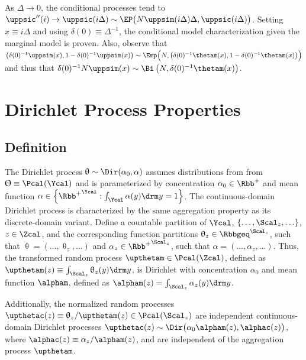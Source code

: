 \documentclass[12pt]{report}
\begin{document}
As $\Delta \to 0$, the conditional processes tend to $\uppsic''(i) \to \uppsic(i \Delta) \sim \EP\big( N \uppsim(i \Delta) \Delta, \uppsic(i \Delta) \big)$. Setting $x \equiv i\Delta$ and using $\delta(0) \equiv \Delta^{-1}$, the conditional model characterization given the marginal model is proven. Also, observe that $\big( \delta(0)^{-1} \uppsim(x),1 - \delta(0)^{-1} \uppsim(x)\big) \sim \Emp\Big( N, \big( \delta(0)^{-1} \thetam(x), 1 - \delta(0)^{-1} \thetam(x)\big) \Big)$ and thus that $\delta(0)^{-1} N \uppsim(x) \sim \Bi\left(N, \delta(0)^{-1} \thetam(x) \right)$.
 





\section{Dirichlet Process Properties} \label{app:DP}


\subsection{Definition}

The Dirichlet process $\uptheta \sim \Dir(\alpha_0,\alpha)$ assumes distributions from from $\Uptheta \equiv \Pcal(\Ycal)$ and is parameterized by concentration $\alpha_0 \in \Rbb^+$ and mean function $\alpha \in \left\{ {\Rbb^+}^{\Ycal} : \int_{\Ycal} \alpha(y) {\drm}y = 1 \right\}$. The continuous-domain Dirichlet process is characterized by the same aggregation property as its discrete-domain variant. Define a countable partition of $\Ycal$, $\left\{ \ldots,\Scal_z,\ldots \right\}$, $z \in \Zcal$, and the corresponding function partitions $\uptheta_z \in \Rbbgeq^{\Scal_z}$, such that $\uptheta = \left( \ldots,\uptheta_z,\ldots \right)$ and $\alpha_z \in {\Rbb^+}^{\Scal_z}$, such that $\alpha = \left( \ldots,\alpha_z,\ldots \right)$. Thus, the transformed random process $\upthetam \in \Pcal(\Zcal)$, defined as $\upthetam(z) \equiv \int_{\Scal_z} \uptheta_z(y) {\drm}y$, is Dirichlet with concentration $\alpha_0$ and mean function $\alpham$, defined as $\alpham(z) = \int_{\Scal_z} \alpha_z(y) {\drm}y$.

Additionally, the normalized random processes $\upthetac(z) \equiv \uptheta_z / \upthetam(z) \in \Pcal(\Scal_z)$ are independent continuous-domain Dirichlet processes $\upthetac(z) \sim \Dir\big(\alpha_0 \alpham(z), \alphac(z)\big)$, where $\alphac(z) \equiv \alpha_z / \alpham(z)$, and are independent of the aggregation process $\upthetam$.
\end{document}
